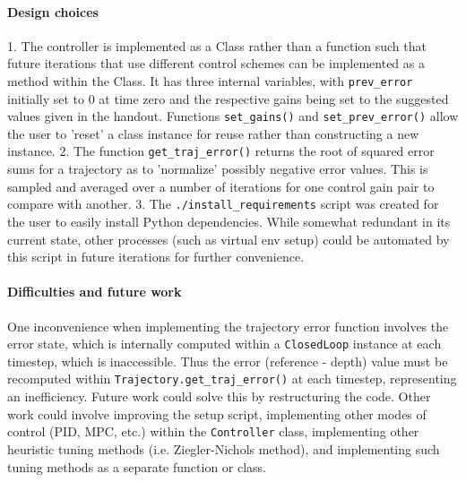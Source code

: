 \documentclass[10pt]{article}
\begin{document}
\paragraph{Design choices}
1. The controller is implemented as a Class rather than a function such that future iterations that use different 
control schemes can be implemented as a method within the Class. It has three internal variables, with 
\texttt{prev\_error} initially set to 0 at time zero and the respective gains being set to the suggested values 
given in the handout. Functions \texttt{set\_gains()} and \texttt{set\_prev\_error()} allow the user to 'reset' 
a class instance for reuse rather than constructing a new instance.
2. The function \texttt{get\_traj\_error()} returns the root of squared error sums for a trajectory as to 'normalize'
possibly negative error values. This is sampled and averaged over a number of iterations for one control gain pair
to compare with another.
3. The \texttt{./install\_requirements} script was created for the user to easily install Python dependencies.
While somewhat redundant in its current state, other processes (such as virtual env setup) could be automated by this
 script in future iterations for further convenience.

\paragraph{Difficulties and future work}
One inconvenience when implementing the trajectory error function involves the error state, which is internally
computed within a \texttt{ClosedLoop} instance at each timestep, which is inaccessible. Thus the error (reference - depth)
value must be recomputed within \texttt{Trajectory.get\_traj\_error()} at each timestep, representing an inefficiency.
Future work could solve this by restructuring the code.
Other work could involve improving the setup script,
implementing other modes of control (PID, MPC, etc.) within the \texttt{Controller} class,
implementing other heuristic tuning methods (i.e. Ziegler-Nichols method),
and implementing such tuning methods as a separate function or class.
\end{document}
